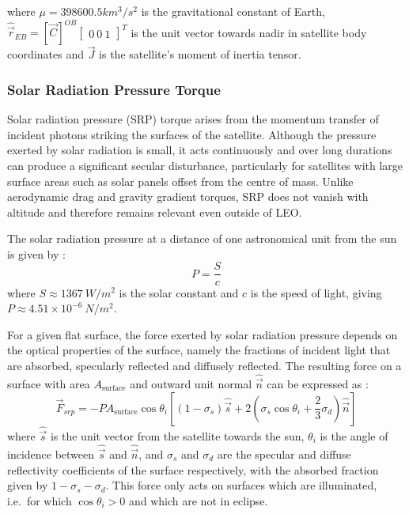where $\mu = 398600.5 km^3/s^2$ is the gravitational constant of Earth, $\hat{\vec{r}}_{EB} = [\vec{C}]^{OB} \begin{bmatrix}0 \ 0 \ 1\end{bmatrix}^T$ is the unit vector towards nadir in satellite body coordinates and $\vec{J}$ is the satellite's moment of inertia tensor.

\subsubsection{Solar Radiation Pressure Torque}
Solar radiation pressure (SRP) torque arises from the momentum transfer of incident photons striking the surfaces of the satellite. Although the pressure exerted by solar radiation is small, it acts continuously and over long durations can produce a significant secular disturbance, particularly for satellites with large surface areas such as solar panels offset from the centre of mass. Unlike aerodynamic drag and gravity gradient torques, SRP does not vanish with altitude and therefore remains relevant even outside of LEO.

The solar radiation pressure at a distance of one astronomical unit from the sun is given by \cite{wertz1999space}:
\begin{equation}
    P = \frac{S}{c}
\end{equation}
where $S \approx 1367 \ W/m^2$ is the solar constant and $c$ is the speed of light, giving $P \approx 4.51 \times 10^{-6} \ N/m^2$.

For a given flat surface, the force exerted by solar radiation pressure depends on the optical properties of the surface, namely the fractions of incident light that are absorbed, specularly reflected and diffusely reflected. The resulting force on a surface with area $A_{\text{surface}}$ and outward unit normal $\hat{\vec{n}}$ can be expressed as \cite{wieSpaceVehicleDynamics1998}:
\begin{equation}
    \vec{F}_{srp} = -P A_{\text{surface}} \cos\theta_i \left[ (1 - \sigma_s)\hat{\vec{s}} + 2\left(\sigma_s \cos\theta_i + \frac{2}{3}\sigma_d\right)\hat{\vec{n}} \right]
\end{equation}
where $\hat{\vec{s}}$ is the unit vector from the satellite towards the sun, $\theta_i$ is the angle of incidence between $\hat{\vec{s}}$ and $\hat{\vec{n}}$, and $\sigma_s$ and $\sigma_d$ are the specular and diffuse reflectivity coefficients of the surface respectively, with the absorbed fraction given by $1 - \sigma_s - \sigma_d$. This force only acts on surfaces which are illuminated, i.e.\ for which $\cos\theta_i > 0$ and which are not in eclipse.

